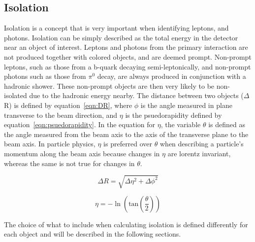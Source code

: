 \subsection{Isolation}
\label{ssec:isolation_summary}
Isolation is a concept that is very important when identifying leptons, and photons.
Isolation can be simply described as the total energy in the detector near an object of interest.
Leptons and photons from the primary interaction are not produced together with colored objects,
and are deemed prompt.
Non-prompt leptons, such as those from a b-quark decaying semi-leptonically,
and non-prompt photons such as those from $\pi ^{0}$ decay,
are always produced in conjunction with a hadronic shower.
These non-prompt objects are then very likely to be non-isolated due to the hadronic energy nearby.
The distance between two objects ($\Delta$R) is defined by equation~\ref{eqn:DR},
where $\phi$ is the angle measured in plane transverse to the beam direction,
and $\eta$ is the psuedorapidity defined by equation~\ref{eqn:psuedorapidity}.
In the equation for $\eta$, the variable $\theta$ is defined as the angle measured from the beam axis to the axis of the transverse plane to the beam axis.
In particle physics, $\eta$ is preferred over $\theta$ when describing a particle's momentum along the beam axis because changes in $\eta$ are lorentz invariant,
whereas the same is not true for changes in $\theta$.

\begin{equation}
  \label{eqn:DR}
  \Delta R = \sqrt{\Delta\eta^{2}+\Delta\phi^{2}}
\end{equation}

\begin{equation}
  \label{eqn:psuedorapidity}
  \eta = -\ln(\mathrm{tan}(\frac{\theta}{2}))
\end{equation}

The choice of what to include when calculating isolation is defined differently for each object and will be described in the following sections.

